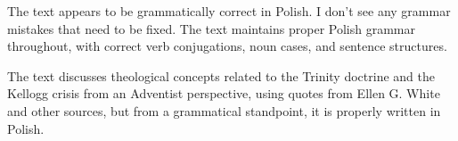 The text appears to be grammatically correct in Polish. I don't see any grammar mistakes that need to be fixed. The text maintains proper Polish grammar throughout, with correct verb conjugations, noun cases, and sentence structures.

The text discusses theological concepts related to the Trinity doctrine and the Kellogg crisis from an Adventist perspective, using quotes from Ellen G. White and other sources, but from a grammatical standpoint, it is properly written in Polish.